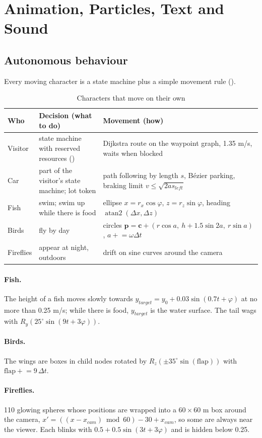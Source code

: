\section{Animation, Particles, Text and Sound}\label{sec:effects}
\subsection{Autonomous behaviour}
Every moving character is a state machine plus a simple movement rule ().
\begin{table}[H]
\centering\small
\caption{Characters that move on their own}\label{tab:ai}
\begin{tabularx}{\linewidth}{@{}P{2.2cm}P{4.0cm}X@{}}
\toprule
Who & Decision (what to do) & Movement (how) \\ \midrule
Visitor & state machine with reserved resources () & Dijkstra route on the waypoint graph, 1.35 m/s, waits when blocked \\
Car & part of the visitor's state machine; lot token & path following by length $s$, Bézier parking, braking limit $v\le\sqrt{2as_{left}}$ \\
Fish & swim; swim up while there is food & ellipse $x=r_x\cos\varphi$, $z=r_z\sin\varphi$, heading $\operatorname{atan2}(\Delta x,\Delta z)$ \\
Birds & fly by day & circles $\mathbf{p} = \mathbf{c} + (r\cos a,\ h + 1.5\sin 2a,\ r\sin a)$, $a \mathrel{+}= \omega\Delta t$ \\
Fireflies & appear at night, outdoors & drift on sine curves around the camera \\
\bottomrule
\end{tabularx}
\end{table}
\paragraph{Fish.} The height of a fish moves slowly towards $y_{target} = y_0 + 0.03\sin(0.7t+\varphi)$ at no more than
0.25 m/s; while there is food, $y_{target}$ is the water surface. The tail wags with $R_y(25^\circ\sin(9t+3\varphi))$.
\paragraph{Birds.} The wings are boxes in child nodes rotated by $R_z(\pm35^\circ\sin(\text{flap}))$ with
$\text{flap} \mathrel{+}= 9\,\Delta t$.
\paragraph{Fireflies.} 110 glowing spheres whose positions are wrapped into a $60\times60$ m box around the camera,
$x' = ((x - x_{cam}) \bmod 60) - 30 + x_{cam}$, so some are always near the viewer. Each blinks with
$0.5+0.5\sin(3t+3\varphi)$ and is hidden below 0.25.

